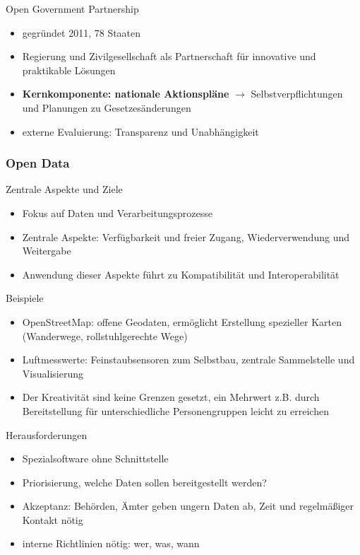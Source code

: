 Open Government Partnership

\begin{itemize}
  \item gegründet 2011, 78 Staaten
  \item Regierung und Zivilgesellschaft als Partnerschaft für innovative und praktikable Lösungen
  \item \textbf{Kernkomponente: nationale Aktionspläne} $\rightarrow$ Selbstverpflichtungen und Planungen zu Gesetzesänderungen
  \item externe Evaluierung: Transparenz und Unabhängigkeit
\end{itemize}

\clearpage
\subsubsection{Open Data}
Zentrale Aspekte und Ziele

\begin{itemize}
  \item Fokus auf Daten und Verarbeitungsprozesse
  \item Zentrale Aspekte: Verfügbarkeit und freier Zugang, Wiederverwendung und Weitergabe
  \item Anwendung dieser Aspekte führt zu Kompatibilität und Interoperabilität
\end{itemize}

Beispiele

\begin{itemize}
  \item OpenStreetMap: offene Geodaten, ermöglicht Erstellung spezieller Karten (Wanderwege, rollstuhlgerechte Wege)
  \item Luftmesswerte: Feinstaubsensoren zum Selbstbau, zentrale Sammelstelle und Visualisierung
  \item Der Kreativität sind keine Grenzen gesetzt, ein Mehrwert z.B. durch Bereitstellung für unterschiedliche Personengruppen leicht zu erreichen
\end{itemize}

Herausforderungen

\begin{itemize}
  \item Spezialsoftware ohne Schnittstelle
  \item Priorisierung, welche Daten sollen bereitgestellt werden?
  \item Akzeptanz: Behörden, Ämter geben ungern Daten ab, Zeit und regelmäßiger Kontakt nötig
  \item interne Richtlinien nötig: wer, was, wann
\end{itemize}

